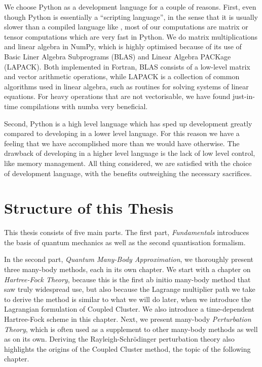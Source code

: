     We choose Python as a development language for a couple of reasons. 
    First, even though Python is essentially a  ``scripting language'', in the sense 
    that it is usually slower than a compiled language like \CC,
    most of our computations are matrix or tensor computations which are very fast
    in Python. We do matrix multiplications and linear algebra in NumPy, which 
    is highly optimised because of its use of Basic Liner Algebra Subprograms (BLAS) 
    and Linear Algebra PACKage (LAPACK).
    Both implemented in Fortran, BLAS consists of a low-level matrix and vector 
    arithmetic operations, while LAPACK is a collection of common algorithms 
    used in linear algebra, such as routines for solving systems of linear 
    equations. For heavy operations that are not vectorisable, we have found
    just-in-time compilations with numba very beneficial.

    Second, Python is a high level language which has sped up development greatly 
    compared to developing in a lower level language. For this reason we 
    have a feeling that we have accomplished more than we would have 
    otherwise. The drawback of developing in a higher level language is the 
    lack of low level control, like memory management. All thing considered,
    we are satisfied with the choice of development language, with the benefits 
    outweighing the necessary sacrifices.

\section{Structure of this Thesis}

    This thesis consists of five main parts. The first part, \emph{Fundamentals} 
    introduces the basis of quantum mechanics as well as the second quantisation 
    formalism.
    
    In the second part, \emph{Quantum Many-Body Approximation}, we 
    thoroughly present three many-body methods, each in its own chapter.
    We start with a chapter on \emph{Hartree-Fock Theory}, because this is 
    the first ab initio many-body method that saw truly widespread use, but 
    also because the Lagrange multiplier path we take to derive the method is 
    similar to what we will do later, when we introduce the Lagrangian formulation 
    of Coupled Cluster.
    We also introduce a time-dependent Hartree-Fock scheme in this chapter.
    Next, we present many-body \emph{Perturbation Theory}, which is often used as
    a supplement to other many-body methods as well as on its own. Deriving 
    the Rayleigh-Schrödinger perturbation theory also highlights the origins 
    of the Coupled Cluster method, the topic of the following chapter.
    
